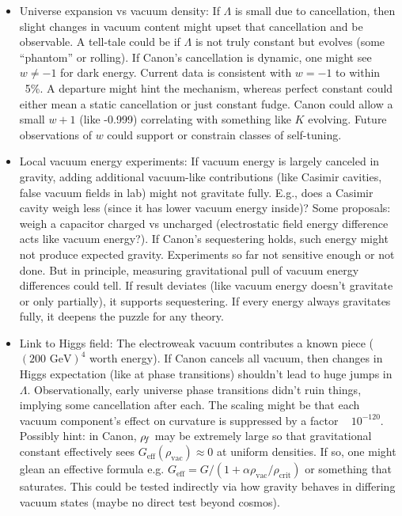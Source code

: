 \documentclass[11pt]{article}
\begin{document}
\begin{itemize}

\item 
Universe expansion vs vacuum density: If $\Lambda$ is small due to cancellation, then slight changes in vacuum content might upset that cancellation and be observable. A tell-tale could be if $\Lambda$ is not truly constant but evolves (some “phantom” or rolling). If Canon’s cancellation is dynamic, one might see $w \neq -1$ for dark energy. Current data is consistent with $w=-1$ to within ~5\%. A departure might hint the mechanism, whereas perfect constant could either mean a static cancellation or just constant fudge. Canon could allow a small $w+1$ (like -0.999) correlating with something like $K$ evolving. Future observations of $w$ could support or constrain classes of self-tuning.




\item 
Local vacuum energy experiments: If vacuum energy is largely canceled in gravity, adding additional vacuum-like contributions (like Casimir cavities, false vacuum fields in lab) might not gravitate fully. E.g., does a Casimir cavity weigh less (since it has lower vacuum energy inside)? Some proposals: weigh a capacitor charged vs uncharged (electrostatic field energy difference acts like vacuum energy?). If Canon’s sequestering holds, such energy might not produce expected gravity. Experiments so far not sensitive enough or not done. But in principle, measuring gravitational pull of vacuum energy differences could tell. If result deviates (like vacuum energy doesn’t gravitate or only partially), it supports sequestering. If every energy always gravitates fully, it deepens the puzzle for any theory.




\item 
Link to Higgs field: The electroweak vacuum contributes a known piece (~$(200 \text{ GeV})^4$ worth energy). If Canon cancels all vacuum, then changes in Higgs expectation (like at phase transitions) shouldn’t lead to huge jumps in $\Lambda$. Observationally, early universe phase transitions didn’t ruin things, implying some cancellation after each. The scaling might be that each vacuum component’s effect on curvature is suppressed by a factor ~ $10^{-120}$. Possibly hint: in Canon, $\rho_{\!f}$ may be extremely large so that gravitational constant effectively sees $G_{\text{eff}}(\rho_{\text{vac}}) \approx 0$ at uniform densities. If so, one might glean an effective formula e.g. $G_{\text{eff}} = G/(1 + \alpha \rho_{\text{vac}}/\rho_{\text{crit}})$ or something that saturates. This could be tested indirectly via how gravity behaves in differing vacuum states (maybe no direct test beyond cosmos).




\end{itemize}
\end{document}
